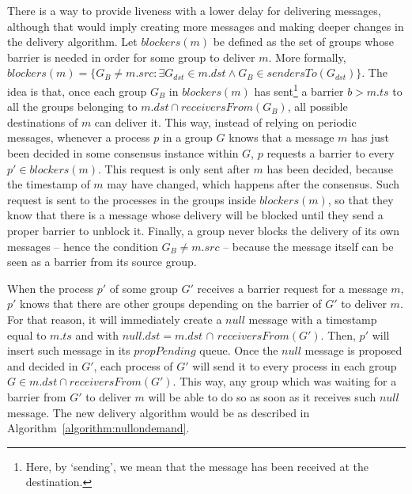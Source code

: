 \documentclass[times, 10pt]{article}
\begin{document}
There is a way to provide liveness with a lower delay for delivering messages, although that would imply creating more messages and making deeper changes in the delivery algorithm. Let $blockers(m)$ be defined as the set of groups whose barrier is needed in order for some group to deliver $m$. More formally, \mbox{$blockers(m) = \{G_B \neq m.src : \exists G_{dst} \in m.dst \wedge G_B \in sendersTo(G_{dst})\}$}. The idea is that, once each group $G_B$ in $blockers(m)$ has sent\footnote{Here, by `sending', we mean that the message has been received at the destination.} a barrier $b > m.ts$ to all the groups belonging to \mbox{$m.dst \cap receiversFrom(G_B)$}, all possible destinations of $m$ can deliver it. This way, instead of relying on periodic messages, whenever a process $p$ in a group $G$ knows that a message $m$ has just been decided in some consensus instance within $G$, $p$ requests a barrier to every $p' \in blockers(m)$. This request is only sent after $m$ has been decided, because the timestamp of $m$ may have changed, which happens after the consensus. Such request is sent to the processes in the groups inside $blockers(m)$, so that they know that there is a message whose delivery will be blocked until they send a proper barrier to unblock it. Finally, a group never blocks the delivery of its own messages -- hence the condition $G_B \neq m.src$ -- because the message itself can be seen as a barrier from its source group.

When the process $p'$ of some group $G'$ receives a barrier request for a message $m$, %
$p'$ knows that there are other groups depending on the barrier of $G'$ to deliver $m$. For that reason, it will immediately create a $null$ message with a timestamp equal to $m.ts$ and with $null.dst = m.dst$ $\cap$ $receiversFrom(G')$. Then, $p'$ will insert such message in its %
$propPending$ queue. %
Once the $null$ message is proposed and decided in $G'$, each process of $G'$ will send it to every process in each group \mbox{$G \in m.dst \cap receiversFrom(G')$}. This way, any group which was waiting for a barrier from $G'$ to deliver $m$ will be able to do so as soon as it receives such $null$ message. The new delivery algorithm would be as described in \mbox{Algorithm {\ref{algorithm:nullondemand}}}.
\end{document}
